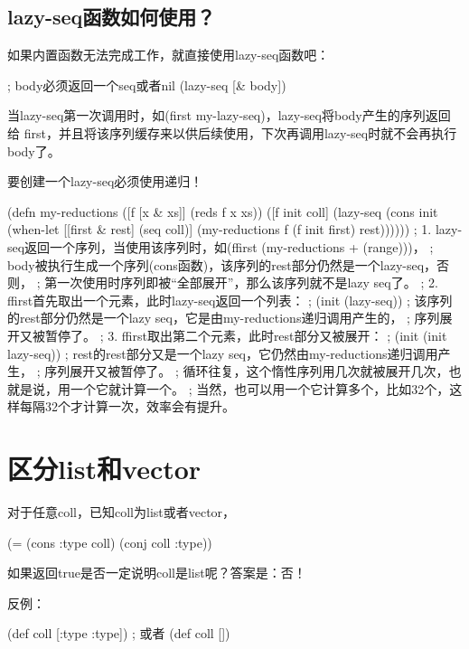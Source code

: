 \documentclass[a4paper,11pt]{article}
\begin{document}
  \subsection[lazy-seq函数如何使用？]{lazy-seq函数如何使用？}
  如果内置函数无法完成工作，就直接使用lazy-seq函数吧：

  \begin{schemecode}
; body必须返回一个seq或者nil
(lazy-seq
  [& body])
  \end{schemecode}
  
  当lazy-seq第一次调用时，如(first my-lazy-seq)，lazy-seq将body产生的序列返回给
  first，并且将该序列缓存来以供后续使用，下次再调用lazy-seq时就不会再执行body了。

  要创建一个lazy-seq必须使用递归！

  \begin{schemecode}
(defn my-reductions
  ([f [x & xs]] (reds f x xs))
  ([f init coll]
     (lazy-seq
      (cons init
            (when-let [[first & rest] (seq coll)]
              (my-reductions f (f init first) rest))))))
; 1. lazy-seq返回一个序列，当使用该序列时，如(ffirst (my-reductions + (range)))，
;    body被执行生成一个序列(cons函数)，该序列的rest部分仍然是一个lazy-seq，否则，
;    第一次使用时序列即被“全部展开”，那么该序列就不是lazy seq了。
; 2. ffirst首先取出一个元素，此时lazy-seq返回一个列表：
;      (init (lazy-seq))
;    该序列的rest部分仍然是一个lazy seq，它是由my-reductions递归调用产生的，
;    序列展开又被暂停了。
; 3. ffirst取出第二个元素，此时rest部分又被展开：
;      (init (init lazy-seq))
;    rest的rest部分又是一个lazy seq，它仍然由my-reductions递归调用产生，
;    序列展开又被暂停了。
; 循环往复，这个惰性序列用几次就被展开几次，也就是说，用一个它就计算一个。
; 当然，也可以用一个它计算多个，比如32个，这样每隔32个才计算一次，效率会有提升。
  \end{schemecode}
  
  \section[区分list和vector]{区分list和vector}
  对于任意coll，已知coll为list或者vector，

  \begin{schemecode}
(= (cons :type coll) (conj coll :type))
  \end{schemecode}

  如果返回true是否一定说明coll是list呢？答案是：否！

  反例：\par
  \begin{schemecode}
(def coll
  [:type :type])
; 或者
(def coll
  [])
  \end{schemecode}
\end{document}
